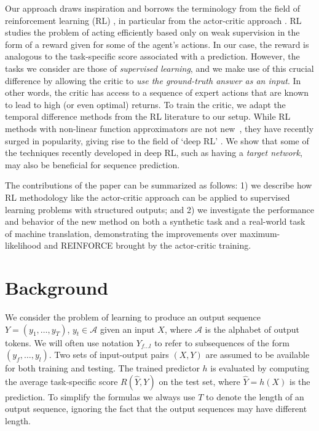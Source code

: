 \documentclass{article} %
\begin{document}
Our approach draws inspiration and borrows the terminology from the field of
reinforcement learning (RL) \citep{sutton1998introduction}, in particular from
the actor-critic approach \citep{sutton1984temporal,sutton1999policy,barto1983neuronlike}.  RL
studies the problem of acting efficiently based
only on weak supervision in the form of a reward given for some of the agent's actions.
In our case, the reward is analogous to the task-specific score associated with a prediction.
However, the tasks we consider are those of \textit{supervised learning}, and
we make use of this crucial difference by allowing the critic to \textit{use the
ground-truth answer as an input}.
In other words, the critic has access to a sequence of expert actions that are
known to lead to high (or even optimal) returns. 
To train the critic, we adapt the temporal
difference methods from the RL literature \citep{sutton1988learning} to our setup.
While RL methods with non-linear function approximators are not new~\citep{tesauro1994td,miller1995neural}, 
they have recently surged in popularity, giving rise to the field of `deep RL'
\citep{mnih2015human}. We show that some of the techniques recently developed in deep RL, such as having a \textit{target network}, may also be beneficial for sequence prediction.

The contributions of the paper can be summarized as follows: 1) we describe how
RL methodology like the actor-critic approach can be applied to
supervised learning problems with structured outputs; and 2) we investigate the
performance and behavior of the new method on both a synthetic task and a
real-world task of machine translation, demonstrating the improvements over
maximum-likelihood and REINFORCE brought by the actor-critic training.

\section{Background}
We consider the problem of learning to produce an output sequence $Y=(y_1,
\ldots, y_T)$, $y_t \in \mathcal{A}$ given an input $X$, where $\mathcal{A}$ is
the alphabet of output tokens. We will often use notation $Y_{f \ldots l}$ to
refer to subsequences of the form $(y_f, \ldots, y_l)$.
Two sets of input-output pairs $(X, Y)$ are
assumed to be available for both training and testing. The
trained predictor $h$ is evaluated by computing the average task-specific score
$R(\hat{Y}, Y)$ on the test set, where $\hat{Y}=h(X)$ is the prediction.
 To
simplify the formulas we always use $T$ to denote the length of an output sequence, ignoring the fact that the output sequences may have different length.
\end{document}
